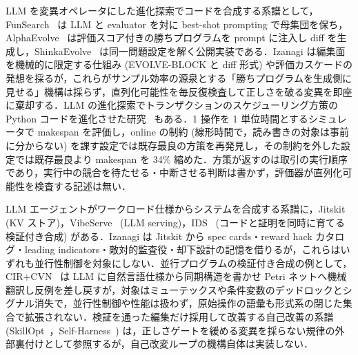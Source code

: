 \documentclass[submit,techrep,noauthor]{ipsj}
\begin{document}
LLM を変異オペレータにした進化探索でコードを合成する系譜として，FunSearch~\cite{funsearch} は LLM と evaluator を対に best-shot prompting で母集団を保ち，AlphaEvolve~\cite{alphaevolve} は評価スコア付きの勝ちプログラムを prompt に注入し diff を生成し，ShinkaEvolve~\cite{shinkaevolve} は同一問題設定を解く公開実装である．Izanagi は編集面を機械的に限定する仕組み (EVOLVE-BLOCK と diff 形式) や評価カスケードの発想を採るが，これらがサンプル効率の源泉とする「勝ちプログラムを生成側に見せる」機構は採らず，直列化可能性を毎反復検査して正しさを破る変異を即座に棄却する．LLM の進化探索でトランザクションのスケジューリング方策の Python コードを進化させた研究~\cite{adrs} もある．1 操作を 1 単位時間とするシミュレータで makespan を評価し，online の制約 (線形時間で，読み書きの対象は事前に分からない) を課す設定では既存最良の方策を再発見し，その制約を外した設定では既存最良より makespan を 34\% 縮めた．方策が返すのは取引の実行順序であり，実行中の競合を待たせる・中断させる判断は書かず，評価器が直列化可能性を検査する記述は無い．

LLM エージェントがワークロード仕様からシステムを合成する系譜に，Jitskit~\cite{jitskit} (KV ストア)，VibeServe~\cite{vibeserve} (LLM serving)，IDS~\cite{ids} (コードと証明を同時に育てる検証付き合成) がある．Izanagi は Jitskit から spec cards・reward hack カタログ・leading indicators・敵対的監査役・却下設計の記憶を借りるが，これらはいずれも並行性制御を対象にしない．並行プログラムの検証付き合成の例として，CIR+CVN~\cite{circvn} は LLM に自然言語仕様から同期構造を書かせ Petri ネットへ機械翻訳し反例を差し戻すが，対象はミューテックスや条件変数のデッドロックとシグナル消失で，並行性制御や性能は扱わず，原始操作の語彙も形式系の閉じた集合で拡張されない．検証を通った編集だけ採用して改善する自己改善の系譜 (SkillOpt~\cite{skillopt}，Self-Harness~\cite{selfharness}) は，正しさゲートを緩める変異を採らない規律の外部裏付けとして参照するが，自己改変ループの機構自体は実装しない．
\end{document}

